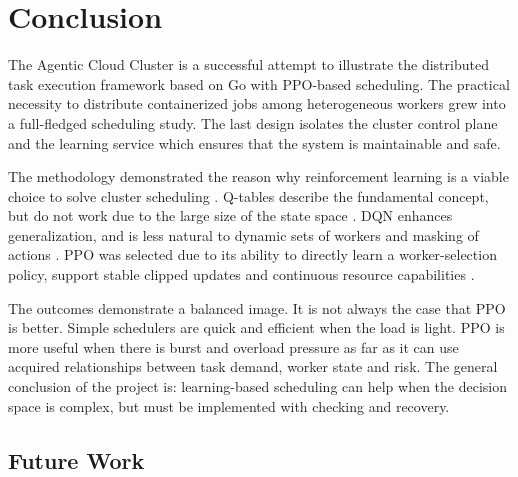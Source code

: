 %
%
%

\chapter{Conclusion}
\label{section:conclusions}

The Agentic Cloud Cluster is a successful attempt to illustrate the distributed task execution framework based on Go with PPO-based scheduling. The practical necessity to distribute containerized jobs among heterogeneous workers grew into a full-fledged scheduling study. The last design isolates the cluster control plane and the learning service which ensures that the system is maintainable and safe.

The methodology demonstrated the reason why reinforcement learning is a viable choice to solve cluster scheduling \cite{sutton2018reinforcement}. Q-tables describe the fundamental concept, but do not work due to the large size of the state space \cite{watkins1992qlearning}. DQN enhances generalization, and is less natural to dynamic sets of workers and masking of actions \cite{mnih2013dqn}. PPO was selected due to its ability to directly learn a worker-selection policy, support stable clipped updates and continuous resource capabilities \cite{gu2025deeprl}.

The outcomes demonstrate a balanced image. It is not always the case that PPO is better. Simple schedulers are quick and efficient when the load is light. PPO is more useful when there is burst and overload pressure as far as it can use acquired relationships between task demand, worker state and risk. The general conclusion of the project is: learning-based scheduling can help when the decision space is complex, but must be implemented with checking and recovery.

\section{Future Work}

